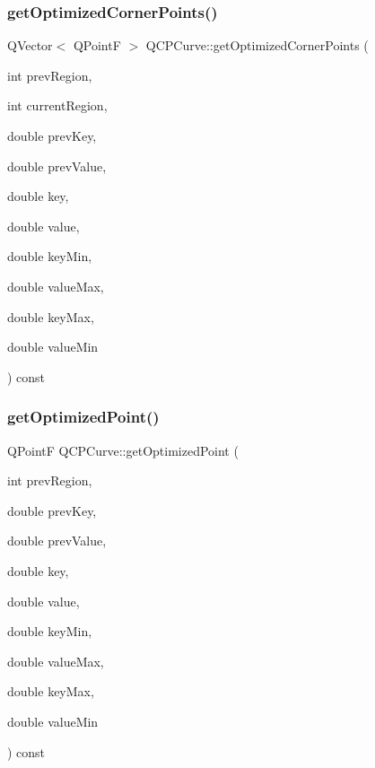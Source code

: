 \subsubsection{\texorpdfstring{get\+Optimized\+Corner\+Points()}{getOptimizedCornerPoints()}}
{\footnotesize\ttfamily Q\+Vector$<$ Q\+PointF $>$ Q\+C\+P\+Curve\+::get\+Optimized\+Corner\+Points (\begin{DoxyParamCaption}\item[{int}]{prev\+Region,  }\item[{int}]{current\+Region,  }\item[{double}]{prev\+Key,  }\item[{double}]{prev\+Value,  }\item[{double}]{key,  }\item[{double}]{value,  }\item[{double}]{key\+Min,  }\item[{double}]{value\+Max,  }\item[{double}]{key\+Max,  }\item[{double}]{value\+Min }\end{DoxyParamCaption}) const\hspace{0.3cm}{\ttfamily [protected]}}

\mbox{\label{class_q_c_p_curve_a1d4530a81f718a2085df03d6a059d5d8}} 
\subsubsection{\texorpdfstring{get\+Optimized\+Point()}{getOptimizedPoint()}}
{\footnotesize\ttfamily Q\+PointF Q\+C\+P\+Curve\+::get\+Optimized\+Point (\begin{DoxyParamCaption}\item[{int}]{prev\+Region,  }\item[{double}]{prev\+Key,  }\item[{double}]{prev\+Value,  }\item[{double}]{key,  }\item[{double}]{value,  }\item[{double}]{key\+Min,  }\item[{double}]{value\+Max,  }\item[{double}]{key\+Max,  }\item[{double}]{value\+Min }\end{DoxyParamCaption}) const\hspace{0.3cm}{\ttfamily [protected]}}


